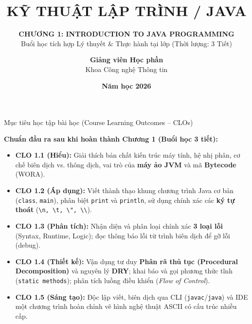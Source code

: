 \documentclass[aspectratio=169, 10pt]{beamer}
\title[\textbf{Chương 1: Introduction to Java}]{\textbf{\LARGE KỸ THUẬT LẬP TRÌNH / JAVA}}
\subtitle{\textbf{\large CHƯƠNG 1: INTRODUCTION TO JAVA PROGRAMMING}\\[2mm]
\small\textcolor{UniLightBlue}{Buổi học tích hợp Lý thuyết \& Thực hành tại lớp (Thời lượng: 3 Tiết)}}
\author[\textbf{Khoa CNTT - Lớp IT26M}]{\textbf{Giảng viên Học phần} \\ \footnotesize Khoa Công nghệ Thông tin}
\institute[\textbf{UDA}]{\textbf{Dành cho sinh viên Khóa 2026 -- Lớp IT26M}\\[1mm]
\scriptsize Dựa trên giáo trình: \textit{Building Java Programs} (Stuart Reges \& Marty Stepp)}
\date{\textbf{Năm học 2026}}
\begin{document}
\begin{frame}[plain]
  \titlepage
\end{frame}

\begin{frame}{Mục tiêu học tập bài học (Course Learning Outcomes -- CLOs)}
  \begin{block}{\textbf{Chuẩn đầu ra sau khi hoàn thành Chương 1 (Buổi học 3 tiết):}}
    \begin{itemize}
      \item[\checkmark] \textbf{CLO 1.1 (Hiểu):} Giải thích bản chất kiến trúc máy tính, hệ nhị phân, cơ chế biên dịch vs. thông dịch, vai trò của \textbf{máy ảo JVM} và mã \textbf{Bytecode} (WORA).
      \item[\checkmark] \textbf{CLO 1.2 (Áp dụng):} Viết thành thạo khung chương trình Java cơ bản (\texttt{class}, \texttt{main}), phân biệt \texttt{print} và \texttt{println}, sử dụng chính xác các \textbf{ký tự thoát} (\texttt{\textbackslash n, \textbackslash t, \textbackslash", \textbackslash\textbackslash}).
      \item[\checkmark] \textbf{CLO 1.3 (Phân tích):} Nhận diện và phân loại chính xác \textbf{3 loại lỗi} (Syntax, Runtime, Logic); đọc thông báo lỗi từ trình biên dịch để gỡ lỗi (debug).
      \item[\checkmark] \textbf{CLO 1.4 (Thiết kế):} Vận dụng tư duy \textbf{Phân rã thủ tục (Procedural Decomposition)} và nguyên lý \textbf{DRY}; khai báo và gọi phương thức tĩnh (\texttt{static methods}); phân tích luồng điều khiển (\textit{Flow of Control}).
      \item[\checkmark] \textbf{CLO 1.5 (Sáng tạo):} Độc lập viết, biên dịch qua CLI (\texttt{javac}/\texttt{java}) và IDE một chương trình hoàn chỉnh vẽ hình nghệ thuật ASCII có cấu trúc nhiều cấp.
    \end{itemize}
  \end{block}
\end{frame}
\end{document}
